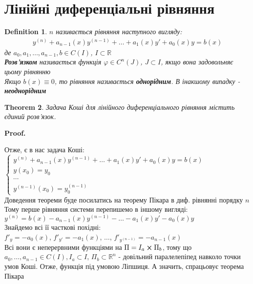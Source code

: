 \documentclass[a4paper, 10pt]{article}
\makeatletter
\def\qed{$\blacksquare$}
\theoremstyle{theoremdd}
\newtheorem{theorem}{Theorem}[subsection]
\theoremstyle{theoremdd}
\newtheorem{definition}[theorem]{Definition}
\theoremstyle{theoremdd}
\theoremstyle{theoremdd}
\theoremstyle{theoremdd}
\theoremstyle{theoremdd}
\theoremstyle{theoremdd}
\theoremstyle{theoremdd}
\renewenvironment{proof}[1][Proof.\\]{\par
\pushQED{\hfill \qed}%
\normalfont \topsep6\p@\@plus6\p@\relax
\trivlist
\item\relax
{\bfseries
#1\@addpunct{.}}\hspace\labelsep\ignorespaces
}{%
\popQED\endtrivlist\@endpefalse
}
\makeatother
\begin{document}
	\section{Лінійні диференціальні рівняння}
	\begin{definition}
 $n$ називається рівняння наступного вигляду:
	\begin{align*}
	y^{(n)} + a_{n-1}(x)y^{(n-1)}+\dots+a_1(x)y'+a_0(x)y=b(x)
	\end{align*}
	де $a_0, a_1,\dots,a_{n-1},b \in C(I)$, $I \subset \mathbb{R}$\\
	\textbf{Розв'язком} називається функція $\varphi \in C^{n}(J)$, $J \subset I$, якщо вона задовольняє цьому рівнянню\\
	Якщо $b(x) \equiv 0$, то рівняння називається \textbf{однорідним}. В інакшому випадку - \textbf{неоднорідним}
	\end{definition}
	
	\begin{theorem}
 Задача Коші для лінійного диференціального рівняння містить єдиний розв'язок.
 	\end{theorem}
 	
	\begin{proof}
	Отже, є в нас задача Коші:\\
	$\begin{cases}
	y^{(n)} + a_{n-1}(x)y^{(n-1)}+\dots+a_1(x)y'+a_0(x)y=b(x)\\
	y(x_0) = y_0\\
	\cdots\\
	y^{(n-1)}(x_0) = y_0^{(n-1)}
	\end{cases}
	$\\
	Доведення теореми буде посилатись на теорему Пікара в диф. рівнянні порядку $n$\\
	Тому перше рівняння системи перепишемо в іншому вигляді:\\
	$y^{(n)} = b(x) - a_{n-1}(x)y^{(n-1)} - \dots - a_1(x)y' - a_0(x)y$\\
	Знайдемо всі її часткові похідні:\\
	$f'_y = -a_0(x)$, $f'_{y'} = -a_1(x)$, $\dots$, $f'_{y^{(n-1)}} = -a_{n-1}(x)$\\
	Всі вони є неперервними функціями на $\Pi = I_a \cross \Pi_b$, тому що \\$a_0,\dots,a_{n-1} \in C(I), I_a \subset I$, $\Pi_b \subset \mathbb{R}^n$ - довільний паралелепіпед навколо точки умов Коші. Отже, функція під умовою Ліпшиця. А значить, спрацьовує теорема Пікара 
\end{proof}
\end{document}
